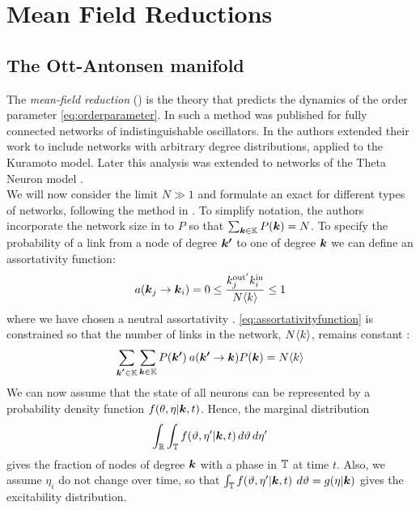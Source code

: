 \newpage
\section{Mean Field Reductions}
\subsection{The Ott-Antonsen manifold}
The \textsl{mean-field reduction} (\MFR) is the theory that predicts the dynamics of the order parameter \eqref{eq:orderparameter}. In \cite{OttAntonsen2008, OttAntonsen2009, OttAntonsen2010} such a method was published for fully connected networks of indistinguishable oscillators. In \cite{Restrepo2014} the authors extended their work to include networks with arbitrary degree distributions, applied to the Kuramoto model. Later this analysis was extended to networks of the Theta Neuron model \cite{OttAntonsen2017}. \\

We will now consider the limit $N \gg 1$ and formulate an exact \MFR for different types of networks, following the method in \cite{OttAntonsen2017}. To simplify notation, the authors incorporate the network size in to $P$ so that $\sum_{{\boldsymbol{k}} \in {\mathbb{K}}} P({\boldsymbol{k}}) = N$. To specify the probability of a link from a node of degree ${\boldsymbol{k'}}$ to one of degree ${\boldsymbol{k}}$ we can define an assortativity function:
\begin{align}
a\left(\k_j \rightarrow \k_i \right) = 0 \leq \frac{k^{\rm{out}^{\prime}}_j k^{\rm{in}}_i}{N \kmean} \leq 1 \label{eq:assortativityfunction}
\end{align}
where we have chosen a neutral assortativity \cite{OttAntonsen2017}. \eqref{eq:assortativityfunction} is constrained so that the number of links in the network, $N {\langle k\rangle}$, remains constant \cite{Restrepo2014}:
\begin{align*}
\sum_{\kacc \in \K} \sum_{\k \in \K} P\left( \kacc \right) \: a\left(\kacc \rightarrow \k\right) P\left(\k\right) = N \kmean
\end{align*}
We can now assume that the state of all neurons can be represented by a probability density function $f(\theta, \eta | {\boldsymbol{k}}, t)$. Hence, the marginal distribution 
\begin{align*}
    \int_{{\mathbb{R}}} \int_{{\mathbb{T}}} f(\vartheta, \eta^{\prime} | {\boldsymbol{k}}, t) \mathop{d \vartheta} \mathop{d \eta^{\prime}} 
\end{align*}
gives the fraction of nodes of degree ${\boldsymbol{k}}$ with a phase in ${\mathbb{T}}$ at time $t$. Also, we assume $\eta_i$ do not change over time, so that $\int_{{\mathbb{T}}} f(\vartheta, \eta^{\prime} | {\boldsymbol{k}}, t) \: \mathop{d \vartheta} = g(\eta | {\boldsymbol{k}})$ gives the excitability distribution. \\


